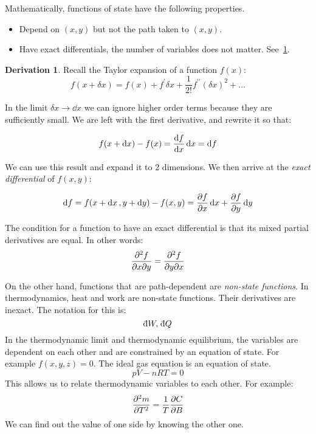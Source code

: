 \documentclass[12pt,chapterprefix=false,dvipsnames]{scrbook}
\theoremstyle{dotless}
\theoremstyle{definition}
\newtheorem{protoderivation}{Derivation}[section]
\newenvironment{derivation}
{\colorlet{shadecolor}{purple!15}\begin{shaded}\begin{protoderivation}}
			{\end{protoderivation}\end{shaded}}
\def\dbar{{\mathchar'26\mkern-10mu \mathrm{d}}}
\begin{document}
Mathematically, functions of state have the following
properties.
\begin{itemize}
	\item Depend on $(x,y)$ but not the path taken to
	      $(x,y)$.
	\item Have exact differentials, the number of variables does not
	      matter. See~\ref{def:exact_differentials}.
\end{itemize}

\begin{derivation}%
	\label{def:exact_differentials}
	Recall the Taylor expansion of a function
	$f(x)$:
	\begin{equation}
		f(x + \delta x) = f(x) + f^\prime\delta x +
		\frac{1}{2!}f^{\prime\prime}{(\delta x)}^2 + \hdots
	\end{equation}

	In the limit $\delta x \rightarrow \dd{x}$ we can ignore higher order
	terms because they are sufficiently small. We are left with the
	first derivative, and rewrite it so that:

	\begin{equation}
		f(x + \dd{x}) - f(x) =
		\dv{f}{x}\dd{x} =
		\dd{f}
	\end{equation}

	We can use this result and expand it to 2 dimensions. We then
	arrive at the \textit{exact differential} of $f(x,y)$:

	\begin{equation}
		\dd{f}
		=
		f(x + \dd{x}, y + \dd{y}) -
		f(x,y) = \pdv{f}{x}\dd{x} +
		\pdv{f}{y}\dd{y}
	\end{equation}

	The condition for a function to have an exact differential is
	that its mixed partial derivatives are equal. In other words:
	\begin{equation}
		\pdv{f}{x}{y}
		=
		\pdv{f}{y}{x}
	\end{equation}
\end{derivation}

On the other hand, functions that are path-dependent are
\textit{non-state functions}. In thermodynamics, heat and work are
non-state functions. Their derivatives are inexact. The notation
for this is: \[
	\dbar W ,\,
	\dbar Q
\] In the thermodynamic limit
and thermodynamic equilibrium, the variables are dependent on
each other and are constrained by an equation of state. For
example $f(x,y,z) = 0$. The ideal gas equation is an
equation of state.
\begin{equation}
	\label{eq:ideal_gas}
	pV - nRT = 0
\end{equation}
This allows us to relate thermodynamic variables to each other.
For example: \[
	\pdv[2]{m}{T} =
	\frac{1}{T}\pdv{C}{B}
\] We can find out the value
of one side by knowing the other one.
\end{document}
